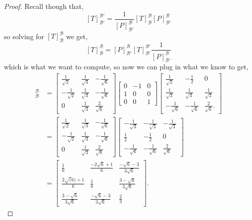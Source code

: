 \documentclass[11pt]{article}
\begin{document}
\begin{proof}
  Recall though that,
  \[[T]_{\mathcal{B}'}^{\mathcal{B}'} = \frac{1}{[P]_{\mathcal{B}'}^{\mathcal{B}}} [T]_{\mathcal{B}}^{\mathcal{B}} [P]_{\mathcal{B}'}^{\mathcal{B}}\]
  so solving for $[T]_{\mathcal{B}}^{\mathcal{B}}$ we get,
  \[[T]_{\mathcal{B}}^{\mathcal{B}} = [P]_{\mathcal{B}'}^{\mathcal{B}} [T]_{\mathcal{B}'}^{\mathcal{B}'} \frac{1}{[P]_{\mathcal{B}'}^{\mathcal{B}}}\]
  which is what we want to compute, so now we can plug in what we know to get,
  \begin{align*}
    [T]_{\mathcal{B}}^{\mathcal{B}} &= \begin{bmatrix}
      \frac{1}{\sqrt{2}} & \frac{1}{\sqrt{3}} & -\frac{1}{\sqrt{6}} \\
      - \frac{1}{\sqrt{2}} & \frac{1}{\sqrt{3}} & -\frac{1}{\sqrt{6}} \\
      0 & \frac{1}{\sqrt{3}} & \frac{2}{\sqrt{6}}
    \end{bmatrix} \begin{bmatrix}
      0 & -1 & 0 \\
      1 & 0 & 0 \\
      0 & 0 & 1
    \end{bmatrix}\begin{bmatrix}
      \frac{1}{\sqrt{2}} & -\frac{1}{2} & 0 \\
      \frac{1}{\sqrt{3}} & \frac{1}{\sqrt{3}} & \frac{1}{\sqrt{3}} \\
      -\frac{1}{\sqrt{6}} & -\frac{1}{\sqrt{6}} & \frac{2}{\sqrt{6}}.
    \end{bmatrix} \\
    &= \begin{bmatrix}
      \frac{1}{\sqrt{2}} & \frac{1}{\sqrt{3}} & -\frac{1}{\sqrt{6}} \\
      - \frac{1}{\sqrt{2}} & \frac{1}{\sqrt{3}} & -\frac{1}{\sqrt{6}} \\
      0 & \frac{1}{\sqrt{3}} & \frac{2}{\sqrt{6}}
    \end{bmatrix} \begin{bmatrix}
      -\frac{1}{\sqrt{3}} & -\frac{1}{\sqrt{3}} & -\frac{1}{\sqrt{3}} \\
      \frac{1}{2} & -\frac{1}{2} & 0 \\
      -\frac{1}{\sqrt{6}} & -\frac{1}{\sqrt{6}} & \frac{2}{\sqrt{6}}
    \end{bmatrix} \\
    &= \begin{bmatrix}
      \frac{1}{6} & \frac{-2\sqrt{6} + 1}{6} & \frac{-\sqrt{6} -3}{3\sqrt{6}} \\
      \frac{2\sqrt(6) + 1}{6} & \frac{1}{6} & \frac{3- \sqrt{6}}{3\sqrt{6}} \\
      \frac{3-\sqrt{6}}{3\sqrt{6}} & \frac{-\sqrt{6} -3}{3\sqrt{6}} &\frac{2}{3}
    \end{bmatrix}.
  \end{align*}
\end{proof}
\end{document}
